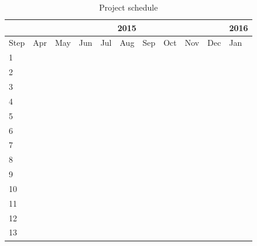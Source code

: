 \documentclass[11pt]{article}
\begin{document}
\begin{table}[!htb]
\centering
\caption{Project schedule}
\label{my-label}
\begin{tabular}{l|l|l|l|l|l|l|l|l|l|l|}
\cline{2-11}
 & \multicolumn{9}{c|}{2015} & 2016 \\ \hline
\multicolumn{1}{|l|}{Step} & Apr & May & Jun & Jul & Aug & Sep & Oct & Nov & Dec & \multicolumn{1}{l|}{Jan} \\ \hline
\multicolumn{1}{|l|}{1} & \cellcolor{midgray} & \cellcolor{midgray} & \cellcolor{midgray} & \cellcolor{midgray} & \cellcolor{midgray} & \cellcolor{midgray} & \cellcolor{midgray} & \cellcolor{midgray} & \cellcolor{midgray} & \multicolumn{1}{l|}{\cellcolor{midgray}} \\ \hline
\multicolumn{1}{|l|}{2} & \cellcolor{midgray} &  &  &  &  &  &  &  &  & \multicolumn{1}{l|}{} \\ \hline
\multicolumn{1}{|l|}{3} &  & \cellcolor{midgray} &  &  &  &  &  &  &  & \multicolumn{1}{l|}{} \\ \hline
\multicolumn{1}{|l|}{4} &  &  & \cellcolor{midgray} & \cellcolor{midgray} &  &  &  &  &  & \multicolumn{1}{l|}{} \\ \hline
\multicolumn{1}{|l|}{5} &  &  & \cellcolor{midgray} & \cellcolor{midgray} &  &  &  &  &  & \multicolumn{1}{l|}{} \\ \hline
\multicolumn{1}{|l|}{6} &  &  &  &  & \cellcolor{midgray} &  &  &  &  & \multicolumn{1}{l|}{} \\ \hline
\multicolumn{1}{|l|}{7} &  &  &  &  & \cellcolor{midgray} &  &  &  &  & \multicolumn{1}{l|}{} \\ \hline
\multicolumn{1}{|l|}{8} &  &  &  &  & \cellcolor{midgray} & \cellcolor{midgray} &  &  &  & \multicolumn{1}{l|}{} \\ \hline
\multicolumn{1}{|l|}{9} &  &  &  &  &  & \cellcolor{midgray} & \cellcolor{midgray} &  &  & \multicolumn{1}{l|}{} \\ \hline
\multicolumn{1}{|l|}{10} &  &  &  &  &  &  &  & \cellcolor{midgray} &  & \multicolumn{1}{l|}{} \\ \hline
\multicolumn{1}{|l|}{11} &  &  &  &  &  &  & \cellcolor{midgray} & \cellcolor{midgray}  & \cellcolor{midgray} & \multicolumn{1}{l|}{\cellcolor{midgray}} \\ \hline
\multicolumn{1}{|l|}{12} &  &  &  &  &  &  &  & \cellcolor{midgray} & \cellcolor{midgray} & \multicolumn{1}{l|}{} \\ \hline
\multicolumn{1}{|l|}{13} &  &  &  &  &  &  &  &  &  & \multicolumn{1}{l|}{\cellcolor{midgray}} \\ \hline
\end{tabular}
\end{table}

\clearpage


\setlength{\bibsep}{6pt}

\end{document}
